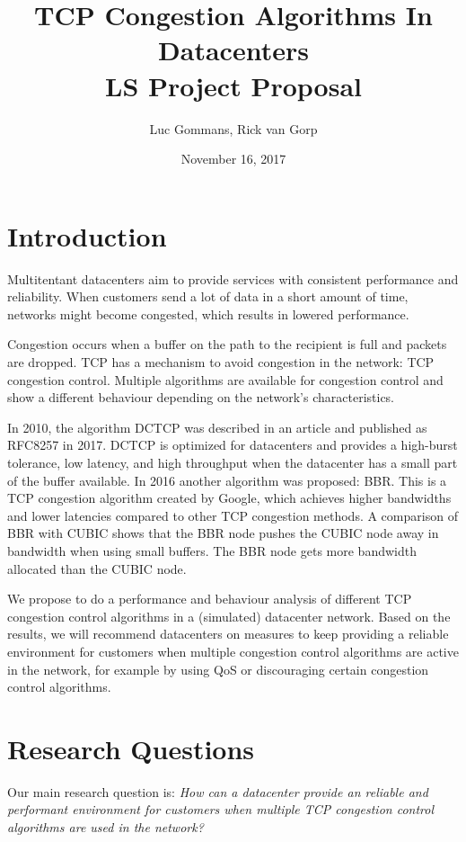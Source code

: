 \documentclass{article}
\title{TCP Congestion Algorithms In Datacenters \\
	\vspace{0.3cm}
	{\large LS Project Proposal}
}
\date{November 16, 2017}
\author{Luc Gommans, Rick van Gorp}
\begin{document}
\maketitle

\section{Introduction}

Multitentant datacenters aim to provide services with consistent performance
and reliability. When customers send a lot of data in a short amount of time,
networks might become congested, which results in lowered performance.

Congestion occurs when a buffer on the path to the recipient is full and
packets are dropped. TCP has a mechanism to avoid congestion in the network:
TCP congestion control. Multiple algorithms are available for congestion
control and show a different behaviour depending on the network's
characteristics.

In 2010, the algorithm DCTCP was described in an
article\cite{dctcp-congestion-original} and published as RFC8257 in
2017\cite{dctcp-congestion}. DCTCP is optimized for datacenters and provides a
high-burst tolerance, low latency, and high throughput when the datacenter has
a small part of the buffer available\cite{dctcp-congestion}. In 2016 another
algorithm was proposed: BBR. This is a TCP congestion algorithm created by
Google, which achieves higher bandwidths and lower latencies compared to other
TCP congestion methods\cite{bbr-congestion}. A comparison of BBR with
CUBIC\cite{bbr-congestion-comparison} shows that the BBR node pushes the CUBIC
node away in bandwidth when using small buffers. The BBR node gets more
bandwidth allocated than the CUBIC node.

We propose to do a performance and behaviour analysis of different TCP
congestion control algorithms in a (simulated) datacenter network. Based on the
results, we will recommend datacenters on measures to keep providing a reliable
environment for customers when multiple congestion control algorithms are
active in the network, for example by using QoS or discouraging certain
congestion control algorithms.


\section{Research Questions}

Our main research question is:
{\it How can a datacenter provide an reliable and performant environment for
customers when multiple TCP congestion control algorithms are used in the
network?}
\end{document}
